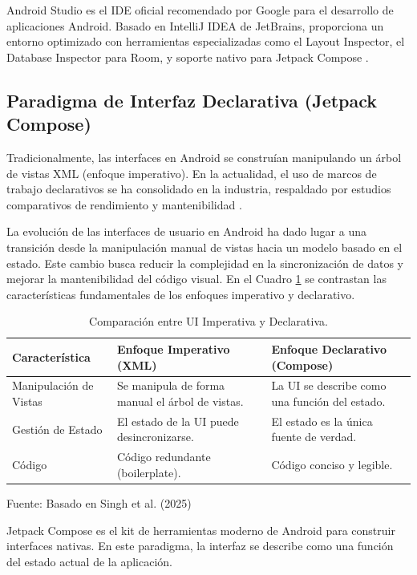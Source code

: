 Android Studio es el IDE oficial recomendado por Google para el desarrollo de aplicaciones Android. Basado en IntelliJ IDEA de JetBrains, proporciona un entorno optimizado con herramientas especializadas como el Layout Inspector, el Database Inspector para Room, y soporte nativo para Jetpack Compose \cite{android_studio}.

\subsection{Paradigma de Interfaz Declarativa (Jetpack Compose)}
Tradicionalmente, las interfaces en Android se construían manipulando un árbol de vistas XML (enfoque imperativo). En la actualidad, el uso de marcos de trabajo declarativos se ha consolidado en la industria, respaldado por estudios comparativos de rendimiento y mantenibilidad \cite{singh2025comparative, jain2023compose}.

La evolución de las interfaces de usuario en Android ha dado lugar a una transición desde la manipulación manual de vistas hacia un modelo basado en el estado. Este cambio busca reducir la complejidad en la sincronización de datos y mejorar la mantenibilidad del código visual. En el Cuadro \ref{tab:imperative_vs_declarative} se contrastan las características fundamentales de los enfoques imperativo y declarativo.

\begin{table}[H]
\centering
\begin{tabularx}{\linewidth}{p{4cm} p{4cm} p{4cm}}
\toprule
Característica & Enfoque Imperativo (XML) & Enfoque Declarativo (Compose) \\
\midrule
Manipulación de Vistas & Se manipula de forma manual el árbol de vistas. & La UI se describe como una función del estado. \\
Gestión de Estado & El estado de la UI puede desincronizarse. & El estado es la única fuente de verdad. \\
Código & Código redundante (boilerplate). & Código conciso y legible. \\
\bottomrule
\end{tabularx}
\caption{Comparación entre UI Imperativa y Declarativa.}\label{tab:imperative_vs_declarative}
Fuente: Basado en Singh et al. (2025) \cite{singh2025comparative}
\end{table}

Jetpack Compose es el kit de herramientas moderno de Android para construir interfaces nativas. En este paradigma, la interfaz se describe como una función del estado actual de la aplicación.


